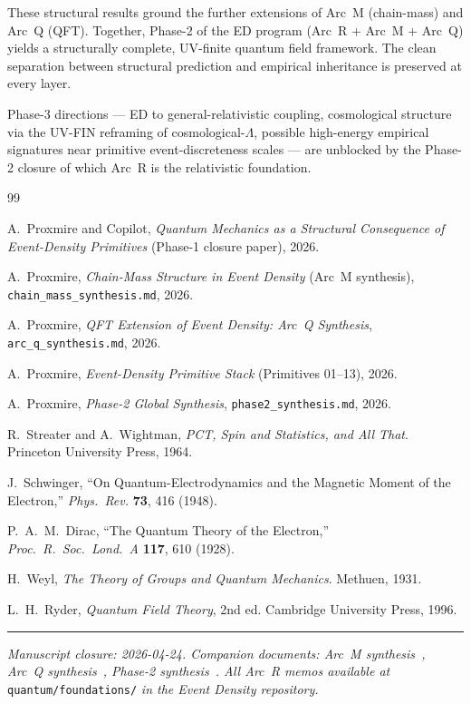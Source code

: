 \documentclass[11pt,a4paper]{article}
\begin{document}
These structural results ground the further extensions of Arc~M (chain-mass) and Arc~Q (QFT). Together, Phase-2 of the ED program (Arc~R + Arc~M + Arc~Q) yields a structurally complete, UV-finite quantum field framework. The clean separation between structural prediction and empirical inheritance is preserved at every layer.

Phase-3 directions --- ED to general-relativistic coupling, cosmological structure via the UV-FIN reframing of cosmological-$\Lambda$, possible high-energy empirical signatures near primitive event-discreteness scales --- are unblocked by the Phase-2 closure of which Arc~R is the relativistic foundation.

\begin{thebibliography}{99}

A.~Proxmire and Copilot, \emph{Quantum Mechanics as a Structural Consequence of Event-Density Primitives} (Phase-1 closure paper), 2026.

A.~Proxmire, \emph{Chain-Mass Structure in Event Density} (Arc~M synthesis), \texttt{chain\_mass\_synthesis.md}, 2026.

A.~Proxmire, \emph{QFT Extension of Event Density: Arc~Q Synthesis}, \texttt{arc\_q\_synthesis.md}, 2026.

A.~Proxmire, \emph{Event-Density Primitive Stack} (Primitives 01--13), 2026.

A.~Proxmire, \emph{Phase-2 Global Synthesis}, \texttt{phase2\_synthesis.md}, 2026.

R.~Streater and A.~Wightman, \emph{PCT, Spin and Statistics, and All That}. Princeton University Press, 1964.

J.~Schwinger, ``On Quantum-Electrodynamics and the Magnetic Moment of the Electron,'' \emph{Phys.\ Rev.} \textbf{73}, 416 (1948).

P.~A.~M.~Dirac, ``The Quantum Theory of the Electron,'' \emph{Proc.\ R.\ Soc.\ Lond.\ A} \textbf{117}, 610 (1928).

H.~Weyl, \emph{The Theory of Groups and Quantum Mechanics}. Methuen, 1931.

L.~H.~Ryder, \emph{Quantum Field Theory}, 2nd ed. Cambridge University Press, 1996.

\end{thebibliography}

\vspace{1em}
\noindent\rule{\linewidth}{0.4pt}
\vspace{0.2em}

\noindent\emph{Manuscript closure: 2026-04-24. Companion documents: Arc~M synthesis~\cite{arcm}, Arc~Q synthesis~\cite{arcq}, Phase-2 synthesis~\cite{phase2syn}. All Arc~R memos available at} \texttt{quantum/foundations/} \emph{in the Event Density repository.}
\end{document}
